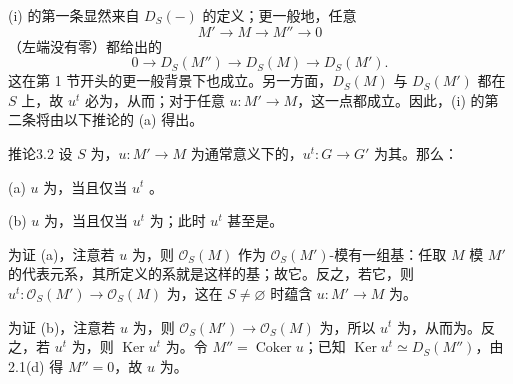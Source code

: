 (i) 的第一条显然来自 $D_S(-)$ 的定义；更一般地，任意
\[
M'\longrightarrow M\longrightarrow M''\longrightarrow0
\]
（左端没有零）都给出的
\[
0\longrightarrow D_S(M'')\longrightarrow D_S(M)\longrightarrow D_S(M').
\]
这在第 1 节开头的更一般背景下也成立。另一方面，$D_S(M)$ 与 $D_S(M')$ 都在 $S$ 上，故 $u^t$ 必为，从而；对于任意 $u:M'\to M$，这一点都成立。因此，(i) 的第二条将由以下推论的 (a) 得出。
\begin{SGAresult}{推论}{3.2}
设 $S$ 为，$u:M'\to M$ 为通常意义下的，$u^t:G\to G'$ 为其。那么：

(a) $u$ 为，当且仅当 $u^t$ 。

(b) $u$ 为，当且仅当 $u^t$ 为；此时 $u^t$ 甚至是。
\end{SGAresult}
为证 (a)，注意若 $u$ 为，则 $\mathcal O_S(M)$ 作为 $\mathcal O_S(M')$-模有一组基：任取 $M$ 模 $M'$ 的代表元系，其所定义的系就是这样的基；故它。反之，若它，则 $u^t:\mathcal O_S(M')\to\mathcal O_S(M)$ 为，这在 $S\ne\varnothing$ 时蕴含 $u:M'\to M$ 为。

为证 (b)，注意若 $u$ 为，则 $\mathcal O_S(M')\to\mathcal O_S(M)$ 为，所以 $u^t$ 为，从而为。反之，若 $u^t$ 为，则 $\operatorname{Ker}u^t$ 为。令 $M''=\operatorname{Coker}u$；已知 $\operatorname{Ker}u^t\simeq D_S(M'')$，由 2.1(d) 得 $M''=0$，故 $u$ 为。

